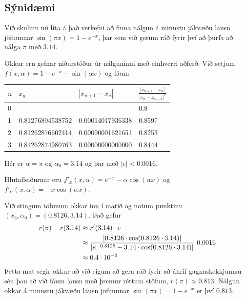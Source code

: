 \documentclass[A4paper,10pt,icelandic]{sphinxmanual}
\begin{document}
\subsection{Sýnidæmi}
\label{kafli01:id2}
Við skulum nú líta á það verkefni að finna nálgun á minnstu jákvæðu
lausn jöfnunnar \(\sin(\pi x)=1-e^{-x}\), þar sem við gerum ráð
fyrir því að þurfa að nálga \(\pi\) með \(3.14\).

Okkur eru gefnar niðurstöður úr nálguninni með einhverri aðferð. Við
setjum \(f(x,\alpha)=1-e^{-x}-\sin(\alpha x)\) og fáum

\begin{tabulary}{\linewidth}{|L|L|L|L|}
\hline
\textsf{\relax 
\(n\)
} & \textsf{\relax 
\(x_n\)
} & \textsf{\relax 
\(|x_{n+1}-x_n|\)
} & \textsf{\relax 
\(\frac{|x_{n+1}-x_n|}{|x_n-x_{n-1}|^2}\)
}\\
 &  &  & 
0.8
\\
 & 
0.81276894538752
 & 
0.00014017936338
 & 
0.8597
\\
 & 
0.81262876602414
 & 
0.00000001621651
 & 
0.8253
\\
 & 
0.81262874980763
 & 
0.00000000000000
 & 
0.8444
\\
\hline\end{tabulary}


Hér er \(\alpha=\pi\) og \(\alpha_0=3.14\) og þar með
\(|e|<0.0016\).

Hlutafleiðurnar eru \(f'_x(x,\alpha)=e^{-x}-\alpha\cos(\alpha x)\)
og \(f'_\alpha(x,\alpha)=-x\cos(\alpha x)\).

Við stingum tölunum okkar inn í matið og notum punktinn
\((x_3,\alpha_0)=(0.8126,3.14)\). Það gefur
\begin{gather}
\begin{split}\begin{aligned}
    r(\pi)-r(3.14)&\approx r'(3.14) \cdot e\\
    &\approx
    \dfrac{|0.8126\cdot \cos(0.8126\cdot 3.14)|}{|e^{-0.8126}-3.14
    \cdot \cos(0.8126 \cdot 3.14)|}\
    0.0016 \\
    &\approx 0.4\cdot 10^{-3}\end{aligned}\end{split}\notag
\end{gather}
Þetta mat segir okkur að við eigum að gera ráð fyrir að áhrif
gagnaskekkjunnar séu þau að við fáum lausn með þremur réttum stöfum,
\(r(\pi) \approx 0.813\). Nálgun okkar á minnstu jákvæðu lausn
jöfnunnar \(\sin(\pi
x)=1-e^{-x}\) er því \(0.813\).
\end{document}
